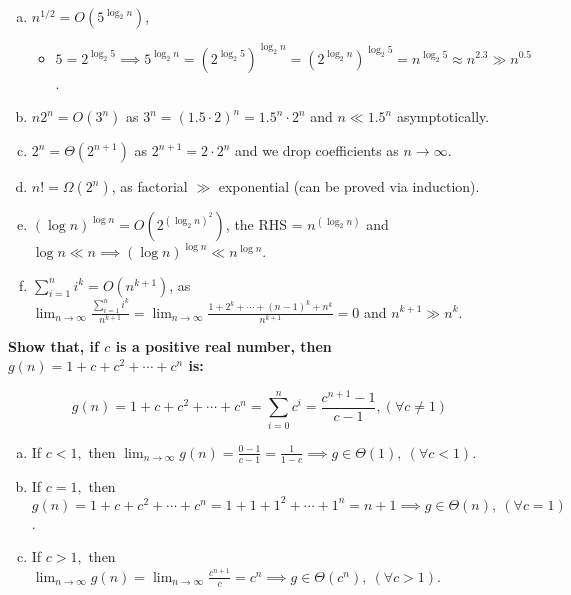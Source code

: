 \begin{problem}{0.1}
\begin{enumerate}[(a)]
        \item $n^{1/2}=O(5^{\log_2 n})$, 
            \begin{itemize}
                \item $5=2^{\log_2 5}\implies5^{\log_2 n}
                    =(2^{\log_2 5})^{\log_2 n}
                    =(2^{\log_2 n})^{\log_2 5}
                    =n^{\log_2 5}\approx n^{2.3}\gg n^{0.5}$.
            \end{itemize}
        \item $n2^n=O(3^n)$ as $3^n = (1.5 \cdot 2)^n = 1.5^n \cdot 2^n$ and $n\ll 1.5^n$ asymptotically.
        \item $2^n=\Theta(2^{n+1})$ as $2^{n+1}=2\cdot2^{n}$ and we drop coefficients as $n\to\infty$.
        \item $n!=\Omega(2^n)$, as factorial $\gg$ exponential (can be proved via induction).
        \item $(\log n)^{\log n}=O(2^{{(\log_2 n)}^2})$, the RHS = $n^{(\log_2 n)}$ and $\log n\ll n
        \implies
        (\log n)^{\log n}\ll n^{\log n}$.
        \item $\displaystyle\sum_{i=1}^n i^k = O(n^{k+1})$, as $\displaystyle\lim_{n\to\infty} \frac{\sum_{i=1}^n i^k}{n^{k+1}} = \lim_{n\to\infty} \frac{1 + 2^k + 
        \cdots + (n-1)^k + n^k}{n^{k+1}} = 0$ and $n^{k+1}\gg n^k$.
    \end{enumerate}
\end{problem}

\newpage
\begin{problem}{0.2}
    \textbf{Show that, if $c$ is a positive real number, then $g(n) = 1 + c + c^2 + \cdots + c^n$ is:}

    \[
        g(n) 
        = 1 + c + c^2 + \cdots + c^n 
        = \displaystyle\sum_{i=0}^n c^i
        = \frac{c^{n+1}-1}{c-1}, 
        (\forall c\neq 1)
    \]

    \begin{enumerate}[(a)]
        \item If $c<1,$ 
        then $\displaystyle\lim_{n\to\infty}g(n)
        =\frac{0-1}{c-1}
        =\frac{1}{1-c}
        \implies \boxed{g\in\Theta(1),} \  (\forall c < 1)$.
        \item If $c=1,$ 
        then $g(n) 
        = 1 + c + c^2 + \cdots + c^n
        = 1 + 1 + 1^2 + \cdots + 1^n
        = n + 1
        \implies \boxed{g\in\Theta(n),} \  (\forall c=1)$.
        \item If $c>1,$ 
        then $\displaystyle\lim_{n\to\infty}g(n)
        =\lim_{n\to\infty}\frac{c^{n+1}}{c}
        = c^n
        \implies \boxed{g\in\Theta(c^n),} \  (\forall c > 1)$.
    \end{enumerate}
\end{problem}


